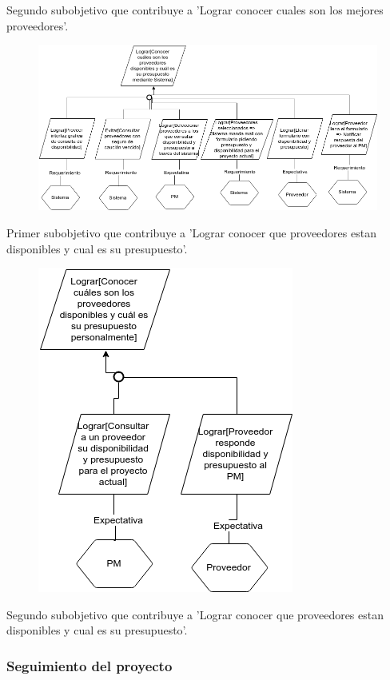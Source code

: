 Segundo subobjetivo que contribuye a 'Lograr conocer cuales son los mejores proveedores'.

\begin{figure}[H]
    \centering
    \includegraphics[width=\textwidth]{imagenes/objetivos-seleccion-mejor-proveedor-3.png}
\end{figure}

Primer subobjetivo que contribuye a 'Lograr conocer que proveedores estan disponibles y cual es su presupuesto'.

\begin{figure}[H]
    \centering
    \includegraphics[width=.5\textwidth]{imagenes/objetivos-seleccion-mejor-proveedor-4.png}
\end{figure}

Segundo subobjetivo que contribuye a 'Lograr conocer que proveedores estan disponibles y cual es su presupuesto'.

\subsubsection{Seguimiento del proyecto}

